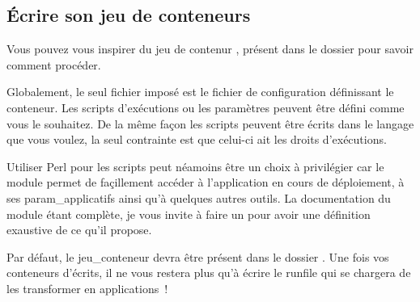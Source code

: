 \subsection{Écrire son jeu de conteneurs}

Vous pouvez vous inspirer du jeu de contenur , présent dans le dossier  pour savoir comment procéder.

Globalement, le seul fichier imposé est le fichier de configuration définissant le conteneur.
Les scripts d'exécutions ou les paramètres peuvent être défini comme vous le souhaitez.
De la même façon les scripts peuvent être écrits dans le langage que vous voulez, la seul contrainte est que celui-ci ait les droits d'exécutions.

Utiliser Perl pour les scripts peut néamoins être un choix à privilégier car le module  permet de façillement accéder à l'\gls{application} en cours de déploiement, à ses \gls{param_applicatifs} ainsi qu'à quelques autres outils.
La documentation du module étant complète, je vous invite à faire un  pour avoir une définition exaustive de ce qu'il propose.

Par défaut, le \gls{jeu_conteneur} devra être présent dans le dossier .
Une fois vos conteneurs d'écrits, il ne vous restera plus qu'à écrire le \gls{runfile} qui se chargera de les transformer en applications~!
